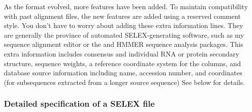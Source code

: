 As the format evolved, more features have been added. To maintain
compatibility with past alignment files, the new features are added
using a reserved comment style. You don't have to worry about adding
these extra information lines. They are generally the province of
automated SELEX-generating software, such as my  sequence
alignment editor or the  and HMMER sequence analysis
packages. This extra information includes consensus and individual RNA
or protein secondary structure, sequence weights, a reference
coordinate system for the columns, and database source information
including name, accession number, and coordinates (for subsequences
extracted from a longer source sequence) See below for details.

\subsubsection {Detailed specification of a SELEX file}

